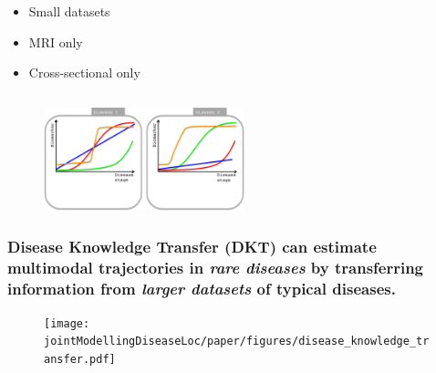 \documentclass[8pt,xcolor=table]{beamer}
\begin{document}
\begin{frame}[label=current]
\begin{columns}[T]
\begin{column}{.47\textwidth}
\begin{center}
  

  \begin{itemize}
   \item Small datasets \no
   \item MRI only \no
   \item Cross-sectional only \no
  \end{itemize}
  
  \end{center}
  \end{column}
\end{columns}

\begin{figure}
\centering
\includegraphics[height=3cm,trim=0 0 650 0,clip]{dpmDiffDiag1.png} 
\end{figure}

\end{frame}

\begin{frame}
\frametitle{Disease Knowledge Transfer (DKT) can estimate multimodal trajectories in \emph{rare diseases} by transferring information from \emph{larger datasets} of typical diseases.}

\begin{figure}
\texttt{[image: \\jointModellingDiseaseLoc/paper/figures/disease\_knowledge\_transfer.pdf]}
\end{figure}

\end{frame}
\end{document}
